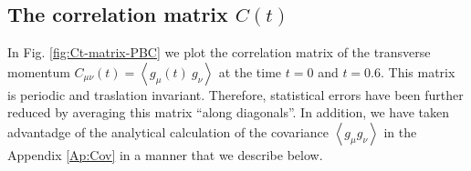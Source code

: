 \documentclass[b5paper,openright,10pt]{book}
\newcommand{\llangle}{\left\langle}
\newcommand{\rrangle}{\right\rangle}
\begin{document}

\subsection{The correlation matrix $C(t)$}

In  Fig. \ref{fig:Ct-matrix-PBC} we  plot the  correlation  matrix of  the
transverse     momentum      $C_{\mu\nu}(t)=\llangle     g_{\mu}(t)\
g_\nu\rrangle$ at  the time  $t=0$ and $t=0.6$.  This  matrix is  periodic and
traslation invariant.  Therefore, statistical errors have been further
reduced by averaging this matrix ``along diagonals''.  In addition, we
have taken advantadge of the  analytical calculation of the covariance
$\llangle g_{\mu} g_\nu\rrangle$ in the Appendix \ref{Ap:Cov} in a
manner that we describe below.
\end{document}
